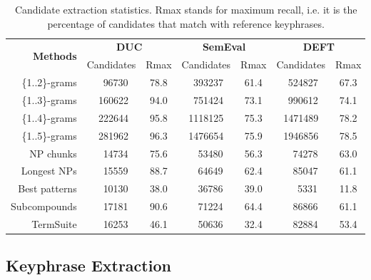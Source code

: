     \begin{table}[h]
      \centering
      \begin{tabular}{rcccccc}
        \toprule
        \multirow{2}{*}[-2pt]{\textbf{Methods}} & \multicolumn{2}{c}{\textbf{DUC}} & \multicolumn{2}{c}{\textbf{SemEval}} & \multicolumn{2}{c}{\textbf{DEFT}}\\
        \cmidrule(r){2-3}\cmidrule(lr){4-5}\cmidrule(l){6-7}
        & Candidates & Rmax & Candidates & Rmax & Candidates & Rmax\\
        \midrule
        \{1..2\}-grams & $~~~~$96730 & 78.8 & $~~$393237 & 61.4 & $~~$524827 & 67.3\\
        \{1..3\}-grams & $~~$160622 & 94.0 & $~~$751424 & 73.1 & $~~$990612 & 74.1\\
        \{1..4\}-grams & $~~$222644 & 95.8 & 1118125 & 75.3 & 1471489 & 78.2\\
        \{1..5\}-grams & $~~$281962 & 96.3 & 1476654 & 75.9 & 1946856 & 78.5\\
        NP chunks & $~~~~$14734 & 75.6 & $~~~~$53480 & 56.3 & $~~~~$74278 & 63.0\\
        Longest NPs & $~~~~$15559 & 88.7 & $~~~~$64649 & 62.4 & $~~~~$85047 & 61.1\\
        Best patterns & $~~~~$10130 & 38.0 & $~~~~$36786 & 39.0 & $~~~~~~$5331 & 11.8\\
        Subcompounds & $~~~~$17181 & 90.6 & $~~~~$71224 & 64.4 & $~~~~$86866 & 61.1 \\
        TermSuite & $~~~~$16253 & 46.1 & $~~~~$50636 & 32.4 & $~~~~$82884 & 53.4\\
        \bottomrule
      \end{tabular}
      \caption{Candidate extraction statistics. Rmax stands for maximum recall,
               i.e. it is the percentage of candidates that match with reference
               keyphrases. \label{tab:candidate_extraction_statistics}}
    \end{table}


  \subsection{Keyphrase Extraction}
  \label{subsec:keyphrase_extraction}

